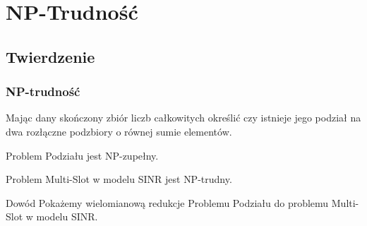 \documentclass[polish, t,10pt]{beamer}
\begin{document}
\section{NP-Trudność}
\subsection{Twierdzenie}
\begin{frame}
    \frametitle{NP-trudność}
    \begin{definition}
        Mając dany skończony zbiór liczb całkowitych określić czy istnieje jego podział na dwa rozłączne podzbiory o równej sumie elementów.
    \end{definition}
    \pause
    \begin{fact}
        Problem Podziału jest NP-zupełny.
    \end{fact}
    \pause
    \begin{theorem}
        Problem Multi-Slot w modelu SINR jest NP-trudny.
    \end{theorem}
    \pause
    \begin{block}{Dowód}
        Pokażemy wielomianową redukcje Problemu Podziału do problemu Multi-Slot w modelu SINR.
    \end{block}
\end{frame}
\end{document}
